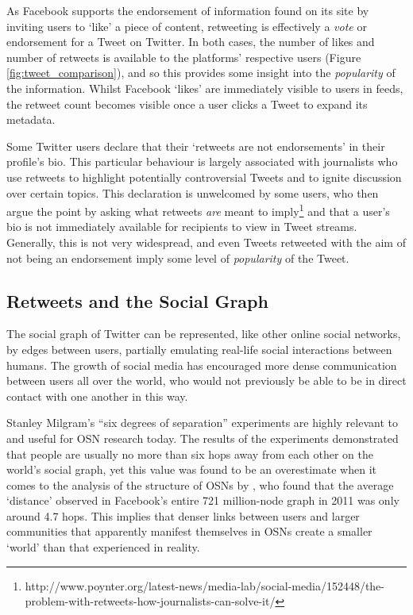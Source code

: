 As Facebook supports the endorsement of information found on its site by inviting users to `like' a piece of content, retweeting is effectively a \textit{vote} or endorsement for a Tweet on Twitter. In both cases, the number of likes and number of retweets is available to the platforms' respective users (Figure \ref{fig:tweet_comparison}), and so this provides some insight into the \textit{popularity} of the information. Whilst Facebook `likes' are immediately visible to users in feeds, the retweet count becomes visible once a user clicks a Tweet to expand its metadata.

Some Twitter users declare that their `retweets are not endorsements' in their profile's bio. This particular behaviour is largely associated with journalists who use retweets to highlight potentially controversial Tweets and to ignite discussion over certain topics. This declaration is unwelcomed by some users, who then argue the point by asking what retweets \textit{are} meant to imply\footnote{http://www.poynter.org/latest-news/media-lab/social-media/152448/the-problem-with-retweets-how-journalists-can-solve-it/} and that a user's bio is not immediately available for recipients to view in Tweet streams. Generally, this is not very widespread, and even Tweets retweeted with the aim of not being an endorsement imply some level of \textit{popularity} of the Tweet. 


\subsection{Retweets and the Social Graph}
The social graph of Twitter can be represented, like other online social networks, by edges between users, partially emulating real-life social interactions between humans. The growth of social media has encouraged more dense communication between users all over the world, who would not previously be able to be in direct contact with one another in this way.

Stanley Milgram's ``six degrees of separation'' \cite{milgram67} experiments are highly relevant to and useful for OSN research today. The results of the experiments demonstrated that people are usually no more than six hops away from each other on the world's social graph, yet this value was found to be an overestimate when it comes to the analysis of the structure of OSNs by \citet{backstrom11}, who found that the average `distance' observed in Facebook's entire 721 million-node graph in 2011 was only around 4.7 hops. This implies that denser links between users and larger communities that apparently manifest themselves in OSNs create a smaller `world' than that experienced in reality.


